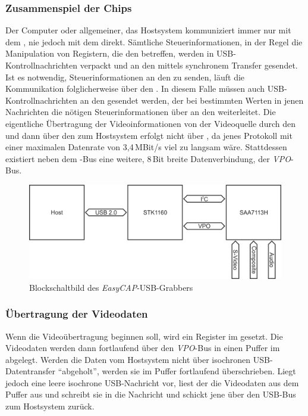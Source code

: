 \subsubsection{Zusammenspiel der Chips}
\label{section:zusammenspiel}
Der Computer oder allgemeiner, das Hostsystem kommuniziert immer nur mit dem \stk, nie jedoch mit dem \saa{} direkt.
Sämtliche Steuerinformationen, in der Regel die Manipulation von Registern, die den \stk{} betreffen, werden in USB-Kontrollnachrichten verpackt und an den \stk{} mittels synchronem Transfer gesendet.
Ist es notwendig, Steuerinformationen an den \saa{} zu senden, läuft die Kommunikation folglicherweise über den \stk.
In diesem Falle müssen auch USB-Kontrollnachrichten an den \stk{} gesendet werden, der bei bestimmten Werten in jenen Nachrichten die nötigen Steuerinformationen über \iic{} an den \saa{} weiterleitet.
Die eigentliche Übertragung der Videoinformationen von der Videoquelle durch den \saa{} und dann über den \stk{} zum Hostsystem erfolgt nicht über \iic, da jenes Protokoll mit einer maximalen Datenrate von 3,4\,MBit/s viel zu langsam wäre.
Stattdessen existiert neben dem \iic-Bus eine weitere, 8\,Bit breite Datenverbindung, der \emph{VPO}-Bus.
\begin{figure}[h]
 \centering
 \includegraphics[width=\textwidth]{blockschaltbild}
 \caption{Blockschaltbild des \emph{EasyCAP}-USB-Grabbers}
\end{figure}

\subsubsection{Übertragung der Videodaten}
Wenn die Videoübertragung beginnen soll, wird ein Register im \saa{} gesetzt.
Die Videodaten werden dann fortlaufend über den \emph{VPO}-Bus in einen Puffer im \stk{} abgelegt.
Werden die Daten vom Hostsystem nicht über isochronen USB-Datentransfer "`abgeholt"', werden sie im Puffer fortlaufend überschrieben.
Liegt jedoch eine leere isochrone USB-Nachricht vor, liest der \stk{} die Videodaten aus dem Puffer aus und schreibt sie in die Nachricht und schickt jene über den USB-Bus zum Hostsystem zurück.